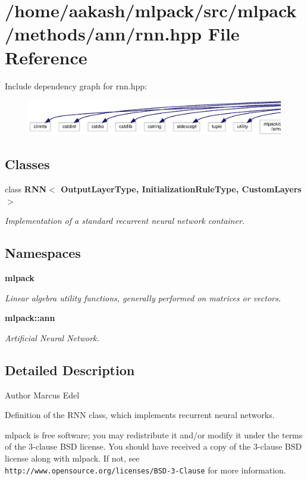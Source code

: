 \section{/home/aakash/mlpack/src/mlpack/methods/ann/rnn.hpp File Reference}
\label{rnn_8hpp}
Include dependency graph for rnn.\+hpp\+:
\nopagebreak
\begin{figure}[H]
\begin{center}
\leavevmode
\includegraphics[width=350pt]{rnn_8hpp__incl}
\end{center}
\end{figure}
\subsection*{Classes}
\begin{DoxyCompactItemize}
\item 
class \textbf{ R\+N\+N$<$ Output\+Layer\+Type, Initialization\+Rule\+Type, Custom\+Layers $>$}
\begin{DoxyCompactList}\small\item\em Implementation of a standard recurrent neural network container. \end{DoxyCompactList}\end{DoxyCompactItemize}
\subsection*{Namespaces}
\begin{DoxyCompactItemize}
\item 
 \textbf{ mlpack}
\begin{DoxyCompactList}\small\item\em Linear algebra utility functions, generally performed on matrices or vectors. \end{DoxyCompactList}\item 
 \textbf{ mlpack\+::ann}
\begin{DoxyCompactList}\small\item\em Artificial Neural Network. \end{DoxyCompactList}\end{DoxyCompactItemize}


\subsection{Detailed Description}
\begin{DoxyAuthor}{Author}
Marcus Edel
\end{DoxyAuthor}
Definition of the R\+NN class, which implements recurrent neural networks.

mlpack is free software; you may redistribute it and/or modify it under the terms of the 3-\/clause B\+SD license. You should have received a copy of the 3-\/clause B\+SD license along with mlpack. If not, see {\tt http\+://www.\+opensource.\+org/licenses/\+B\+S\+D-\/3-\/\+Clause} for more information. 